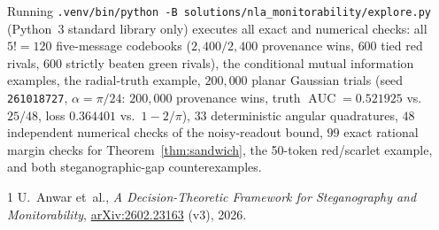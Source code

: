 \documentclass[11pt]{article}
\theoremstyle{plain}
\theoremstyle{definition}
\theoremstyle{remark}
\DeclareMathOperator{\AUC}{AUC}
\begin{document}
Running \texttt{.venv/bin/python -B solutions/nla\_monitorability/explore.py} (Python~3 standard library only) executes all exact and numerical checks: all $5! = 120$ five-message codebooks ($2{,}400/2{,}400$ provenance wins, $600$ tied red rivals, $600$ strictly beaten green rivals), the conditional mutual information examples, the radial-truth example, $200{,}000$ planar Gaussian trials (seed \texttt{261018727}, $\alpha = \pi/24$: $200{,}000$ provenance wins, truth $\AUC = 0.521925$ vs.\ $25/48$, loss $0.364401$ vs.\ $1 - 2/\pi$), $33$ deterministic angular quadratures, $48$ independent numerical checks of the noisy-readout bound, $99$ exact rational margin checks for Theorem~\ref{thm:sandwich}, the 50-token red/scarlet example, and both steganographic-gap counterexamples.

\begin{thebibliography}{1}
U.~Anwar et~al., \emph{A Decision-Theoretic Framework for Steganography and Monitorability}, \href{https://arxiv.org/abs/2602.23163}{arXiv:2602.23163} (v3), 2026.
\end{thebibliography}
\end{document}
